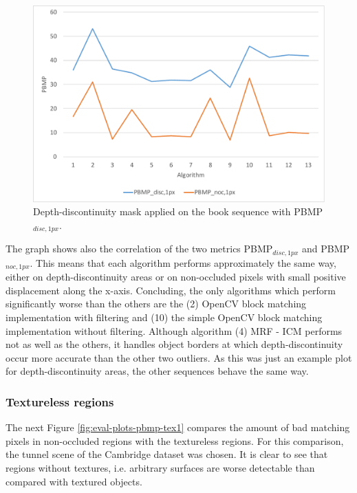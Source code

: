 \begin{figure}[h!]
\centering
\includegraphics[width=1.0\textwidth]{src/images/evaluation/plots/01-book-pbmp-disc-1.pdf}
\caption[Chart of depth-discontinuity mask]{Depth-discontinuity mask applied on the book sequence with PBMP$_{disc,1px}$.}
\label{fig:eval-plots-pbmp-disc1}
\end{figure}

\noindent The graph shows also the correlation of the two metrics PBMP$_{disc,1px}$ and PBMP$_{noc,1px}$.
This means that each algorithm performs approximately the same way, either on depth-discontinuity areas or on non-occluded pixels with small positive displacement along the x-axis.
Concluding, the only algorithms which perform significantly worse than the others are the (2) OpenCV block matching implementation with filtering and (10) the simple OpenCV block matching implementation without filtering.
Although algorithm (4) MRF - ICM performs not as well as the others, it handles object borders at which depth-discontinuity occur more accurate than the other two outliers.
As this was just an example plot for depth-discontinuity areas, the other sequences behave the same way.

\subsubsection{Textureless regions}

\noindent The next Figure \ref{fig:eval-plots-pbmp-tex1} compares the amount of bad matching pixels in non-occluded regions with the textureless regions.
For this comparison, the tunnel scene of the Cambridge dataset was chosen.
It is clear to see that regions without textures, i.e. arbitrary surfaces are worse detectable than compared with textured objects.

